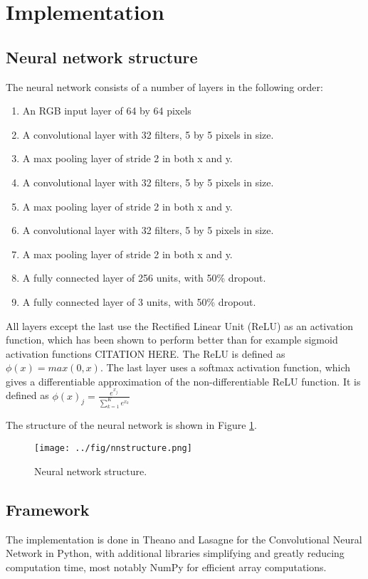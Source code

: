 \section{Implementation}\label{sec:research:history}

\subsection{Neural network structure}\label{sec:research:history}
The neural network consists of a number of layers in the following order:

\begin{enumerate}  
\item An RGB input layer of 64 by 64 pixels
\item A convolutional layer with 32 filters, 5 by 5 pixels in size.
\item A max pooling layer of stride 2 in both x and y.
\item A convolutional layer with 32 filters, 5 by 5 pixels in size.
\item A max pooling layer of stride 2 in both x and y.
\item A convolutional layer with 32 filters, 5 by 5 pixels in size.
\item A max pooling layer of stride 2 in both x and y.
\item A fully connected layer of 256 units, with 50\% dropout.
\item A fully connected layer of 3 units, with 50\% dropout.
\end{enumerate}

All layers except the last use the Rectified Linear Unit (ReLU) as an activation function, which has been shown to perform better than for example sigmoid activation functions CITATION HERE.
The ReLU is defined as $\phi(x) =  max(0,x)$.
The last layer uses a softmax activation function, which gives a differentiable approximation of the non-differentiable ReLU function. It is defined as
$\phi(x)_j = \frac{e^{x_j}}{\sum_{k=1}^{K}{e^{x_k}}}$

The structure of the neural network is shown in Figure \ref{fig:nnstructure}.

\begin{figure}[H]
    \centering
    \texttt{[image: ../fig/nnstructure.png]}
    \caption{Neural network structure.}
    \label{fig:nnstructure}
\end{figure}


\subsection{Framework}\label{sec:research:history}
The implementation is done in Theano and Lasagne for the Convolutional Neural Network in Python, with additional libraries simplifying and greatly reducing computation time, most notably NumPy for efficient array computations. 

